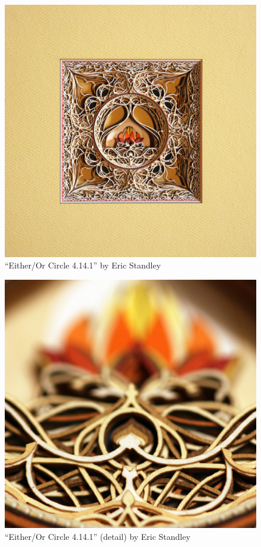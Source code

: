 \documentclass[12pt singlecol]{article}
\begin{document}
\begin{flushleft}
\begin{figure}
  \centering  
  \includegraphics[width=\linewidth]{eric3}
  \caption{``Either/Or Circle 4.14.1'' by Eric Standley \cite{standley}}
  \label{fig:eric3}
\end{figure}	

\begin{figure}
  \centering  
  \includegraphics[width=\linewidth]{eric4}
  \caption{``Either/Or Circle 4.14.1'' (detail) by Eric Standley \cite{standley}}
  \label{fig:eric4}
\end{figure}	


\end{flushleft}
\end{document}

